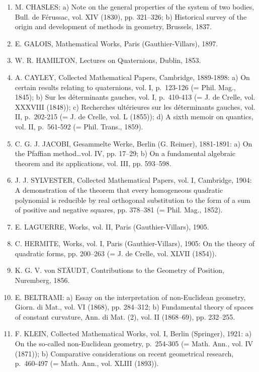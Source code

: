 \begin{enumerate}
  A.-L. CAUCHY: a) Lessons on the applications of infinitesimal calculus to geometry (Complete Works, (2), vol. V, Paris (Gauthier-Villars), 1903); b) On the equation by means of which one determines the secular inequalities of the planets (Complete Works, (2), vol. IX, Paris (Gauthier-Villars), 1891, pp. 174–195).
\item
  M. CHASLES: a) Note on the general properties of the system of two bodies, Bull. de Férussac, vol. XIV (1830), pp. 321–326; b) Historical survey of the origin and development of methods in geometry, Brussels, 1837.
\item
  E. GALOIS, Mathematical Works, Paris (Gauthier-Villars), 1897.
\item
  W. R. HAMILTON, Lectures on Quaternions, Dublin, 1853.
\item
  A. CAYLEY, Collected Mathematical Papers, Cambridge, 1889-1898: a) On certain results relating to quaternions, vol. I, p.~123-126 (= Phil. Mag., 1845); b) Sur les déterminants gauches, vol. I, p.~410-413 (= J. de Crelle, vol. XXXVIII (1848)); c) Recherches ultérieures sur les déterminants gauches, vol. II, p.~202-215 (= J. de Crelle, vol. L (1855)); d) A sixth memoir on quantics, vol. II, p.~561-592 (= Phil. Trans., 1859).
\item
  C. G. J. JACOBI, Gesammelte Werke, Berlin (G. Reimer), 1881-1891: a) On the Pfaffian method\ldots vol. IV, pp. 17–29; b) On a fundamental algebraic theorem and its applications, vol. III, pp. 593–598.
\item
  J. J. SYLVESTER, Collected Mathematical Papers, vol. I, Cambridge, 1904: A demonstration of the theorem that every homogeneous quadratic polynomial is reducible by real orthogonal substitution to the form of a sum of positive and negative squares, pp. 378–381 (= Phil. Mag., 1852).
\item
  E. LAGUERRE, Works, vol. II, Paris (Gauthier-Villars), 1905.
\item
  C. HERMITE, Works, vol. I, Paris (Gauthier-Villars), 1905: On the theory of quadratic forms, pp. 200–263 (= J. de Crelle, vol. XLVII (1854)).
\item
  K. G. V. von STÄUDT, Contributions to the Geometry of Position, Nuremberg, 1856.
\item
  E. BELTRAMI: a) Essay on the interpretation of non-Euclidean geometry, Giorn. di Mat., vol. VI (1868), pp. 284–312; b) Fundamental theory of spaces of constant curvature, Ann. di Mat. (2), vol. II (1868–69), pp. 232–255.
\item
  F. KLEIN, Collected Mathematical Works, vol. I, Berlin (Springer), 1921: a) On the so-called non-Euclidean geometry, p.~254-305 (= Math. Ann., vol. IV (1871)); b) Comparative considerations on recent geometrical research, p.~460-497 (= Math. Ann., vol. XLIII (1893)).

\end{enumerate}
